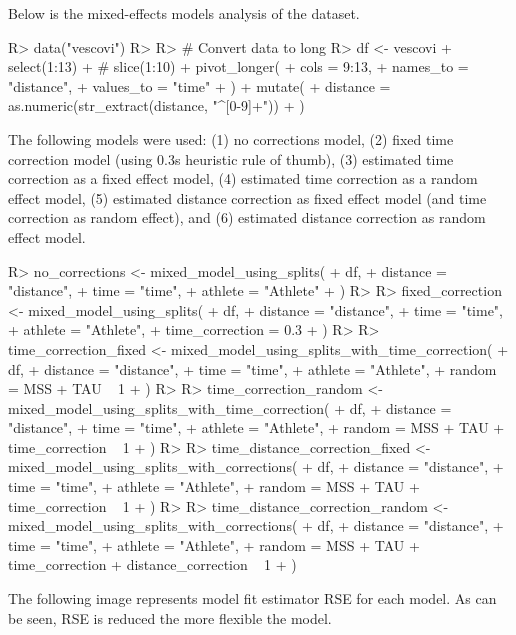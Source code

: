 \documentclass[
]{jss}
\begin{document}
Below is the mixed-effects models analysis of the dataset.

\begin{CodeChunk}
\begin{CodeInput}
R> data("vescovi")
R> 
R> # Convert data to long
R> df <- vescovi %
+   select(1:13) %
+   # slice(1:10) %
+   pivot_longer(
+     cols = 9:13,
+     names_to = "distance",
+     values_to = "time"
+   ) %
+   mutate(
+     distance = as.numeric(str_extract(distance, "^[0-9]+"))
+   )
\end{CodeInput}
\end{CodeChunk}

The following models were used: (1) no corrections model, (2) fixed time correction model (using 0.3s heuristic rule of thumb), (3) estimated time correction as a fixed effect model, (4) estimated time correction as a random effect model, (5) estimated distance correction as fixed effect model (and time correction as random effect), and (6) estimated distance correction as random effect model.

\begin{CodeChunk}
\begin{CodeInput}
R> no_corrections <- mixed_model_using_splits(
+   df,
+   distance = "distance",
+   time = "time",
+   athlete = "Athlete"
+ )
R> 
R> fixed_correction <- mixed_model_using_splits(
+   df,
+   distance = "distance",
+   time = "time",
+   athlete = "Athlete",
+   time_correction = 0.3
+ )
R> 
R> time_correction_fixed <- mixed_model_using_splits_with_time_correction(
+   df,
+   distance = "distance",
+   time = "time",
+   athlete = "Athlete",
+   random = MSS + TAU ~ 1
+ )
R> 
R> time_correction_random <- mixed_model_using_splits_with_time_correction(
+   df,
+   distance = "distance",
+   time = "time",
+   athlete = "Athlete",
+   random = MSS + TAU + time_correction ~ 1
+ )
R> 
R> time_distance_correction_fixed <- mixed_model_using_splits_with_corrections(
+   df,
+   distance = "distance",
+   time = "time",
+   athlete = "Athlete",
+   random = MSS + TAU + time_correction ~ 1
+ )
R> 
R> time_distance_correction_random <- mixed_model_using_splits_with_corrections(
+   df,
+   distance = "distance",
+   time = "time",
+   athlete = "Athlete",
+   random = MSS + TAU + time_correction + distance_correction ~ 1
+ )
\end{CodeInput}
\end{CodeChunk}

The following image represents model fit estimator RSE for each model. As can be seen, RSE is reduced the more flexible the model.
\end{document}
